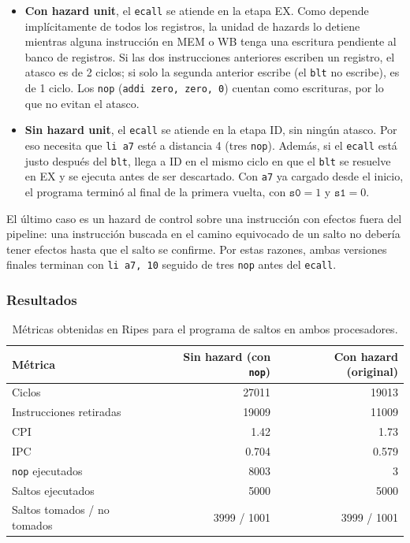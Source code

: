 \documentclass[11pt,a4paper]{article}
\begin{document}
\begin{itemize}
  \item \textbf{Con hazard unit}, el \texttt{ecall} se atiende en la etapa EX.
        Como depende impl\'icitamente de todos los registros, la unidad de
        hazards lo detiene mientras alguna instrucci\'on en MEM o WB tenga una
        escritura pendiente al banco de registros. Si las dos instrucciones
        anteriores escriben un registro, el atasco es de 2 ciclos; si solo la
        segunda anterior escribe (el \texttt{blt} no escribe), es de 1 ciclo.
        Los \texttt{nop} (\texttt{addi zero, zero, 0}) cuentan como escrituras,
        por lo que no evitan el atasco.
  \item \textbf{Sin hazard unit}, el \texttt{ecall} se atiende en la etapa ID,
        sin ning\'un atasco. Por eso necesita que \texttt{li a7} est\'e a
        distancia 4 (tres \texttt{nop}). Adem\'as, si el \texttt{ecall} est\'a
        justo despu\'es del \texttt{blt}, llega a ID en el mismo ciclo en que el
        \texttt{blt} se resuelve en EX y se ejecuta antes de ser descartado.
        Con \texttt{a7} ya cargado desde el inicio, el programa termin\'o al
        final de la primera vuelta, con $\texttt{s0} = 1$ y $\texttt{s1} = 0$.
\end{itemize}
 
El \'ultimo caso es un hazard de control sobre una instrucci\'on con efectos
fuera del pipeline: una instrucci\'on buscada en el camino equivocado de un
salto no deber\'ia tener efectos hasta que el salto se confirme. Por estas
razones, ambas versiones finales terminan con \texttt{li a7, 10} seguido de
tres \texttt{nop} antes del \texttt{ecall}.
 
\subsubsection{Resultados}
\label{sec:resultados2}
 
\begin{table}[h]
  \centering
  \begin{tabular}{@{}lrr@{}}
    \toprule
    M\'etrica & Sin hazard (con \texttt{nop}) & Con hazard (original) \\
    \midrule
    Ciclos                          & 27011  & 19013  \\
    Instrucciones retiradas         & 19009  & 11009  \\
    CPI                             & 1.42   & 1.73   \\
    IPC                             & 0.704  & 0.579  \\
    \texttt{nop} ejecutados         & 8003   & 3      \\
    Saltos ejecutados               & 5000   & 5000   \\
    Saltos tomados / no tomados     & 3999 / 1001 & 3999 / 1001 \\
    \bottomrule
  \end{tabular}
  \caption{M\'etricas obtenidas en Ripes para el programa de saltos en ambos procesadores.}
  \label{tab:resultados2}
\end{table}
 
\end{document}
